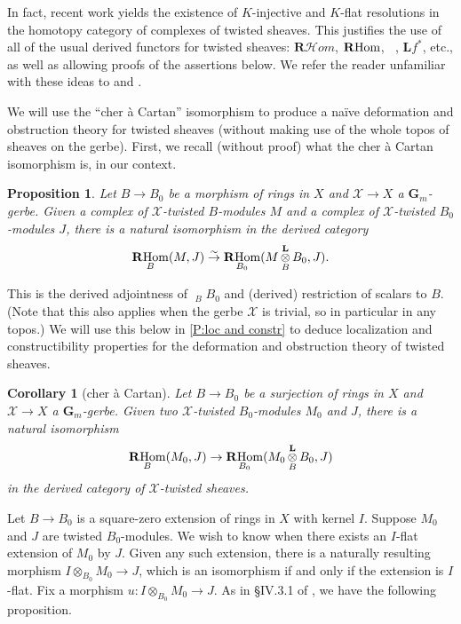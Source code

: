 \documentclass[11pt]{amsart}
\newcommand{\field}[1]{\mathbf #1}
\newcommand{\ms}[1]{\mathscr #1}
\renewcommand{\L}{\field L}
\newcommand{\simto}{\stackrel{\sim}{\to}}
\newcommand{\shom}{\ms H\!om}
\newcommand{\rshom}{\mathbf{R}\shom}
\DeclareMathOperator{\rhom}{\operatorname{{\bf R}Hom}}
\newcommand{\G}{\field G} %
\renewcommand{\[}{[\!\hspace{0.03em}[}
\renewcommand{\]}{]\!\hspace{0.03em}]}
\renewcommand{\(}{(\!\hspace{0.03em}(}
\renewcommand{\)}{)\!\hspace{0.03em})}
\DeclareMathOperator*{\tensor}{\otimes}
\DeclareMathOperator*{\ltensor}{\stackrel{\field L}{\otimes}}
\newtheorem{prop}[lem]{Proposition}
\newtheorem{cor}[lem]{Corollary}
\theoremstyle{definition}
\theoremstyle{remark}
\begin{document}
In fact, recent work \cite{locoresc} yields the existence of 
$K$-injective and $K$-flat resolutions in the homotopy category of 
complexes of twisted sheaves.  This justifies the use of all of the 
usual derived functors for twisted sheaves: $\rshom$, $\rhom$, 
$\ltensor$, $\L f^{\ast}$, etc., as well as allowing proofs of the 
assertions below.  We refer the reader unfamiliar with these 
ideas to \cite{spaltenstein} and \cite{locoresc}.  

We will use the ``cher \`a Cartan'' isomorphism to produce a na\"ive 
deformation and obstruction theory for twisted sheaves (without making 
use of the whole topos of sheaves on the gerbe).  First, we recall 
(without proof) what the cher \`a Cartan isomorphism is, in our 
context.

\begin{prop}\label{C:general cher} Let $B\to B_{0}$ be a morphism of 
rings in $X$ and $\ms X\to X$ a $\G_{m}$-gerbe.  Given a complex of $\ms 
X$-twisted $B$-modules $M$ and a complex of $\ms X$-twisted 
$B_{0}$-modules $J$, there is a natural 
isomorphism in the derived category
$$\rhom_{B}(M,J)\simto\rhom_{B_{0}}(M\ltensor_{B}B_{0},J).$$
\end{prop}

This is the derived 
adjointness of $\ltensor_{B}B_{0}$ and (derived) restriction of scalars 
to $B$.  (Note that this also applies when the gerbe $\ms X$ is 
trivial, so in particular in any topos.)  We will use this below in \ref{P:loc and constr} to deduce 
localization and constructibility properties for the deformation 
and obstruction theory of twisted sheaves.

\begin{cor}[cher \`a Cartan]\label{C:cher} Let $B\to B_{0}$ be a surjection of rings in $X$ and $\ms 
X\to X$ a $\G_{m}$-gerbe.  Given two $\ms X$-twisted $B_{0}$-modules 
$M_{0}$ and $J$, there is a natural isomorphism
$$\rhom_{B}(M_{0},J)\to\rhom_{B_{0}}(M_{0}\ltensor_{B}B_{0},J)$$
in the derived category of $\ms X$-twisted sheaves.
\end{cor}

Let $B\to B_{0}$ is a square-zero extension of rings in 
$X$ with kernel $I$.  Suppose $M_{0}$ and $J$ are twisted 
$B_{0}$-modules.  We wish to know when there exists an $I$-flat 
extension of $M_{0}$ by $J$.  Given any such extension, there is a 
naturally resulting morphism $I\tensor_{B_{0}}M_{0}\to J$, which is an 
isomorphism if and only if the extension is $I$-flat.  Fix a morphism 
$u:I\tensor_{B_{0}}M_{0}\to J$.  As in \S IV.3.1 of \cite{illusie}, we have the 
following proposition.
\end{document}
